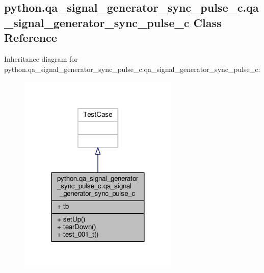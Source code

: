 \subsection{python.\+qa\+\_\+signal\+\_\+generator\+\_\+sync\+\_\+pulse\+\_\+c.\+qa\+\_\+signal\+\_\+generator\+\_\+sync\+\_\+pulse\+\_\+c Class Reference}
\label{classpython_1_1qa__signal__generator__sync__pulse__c_1_1qa__signal__generator__sync__pulse__c}


Inheritance diagram for python.\+qa\+\_\+signal\+\_\+generator\+\_\+sync\+\_\+pulse\+\_\+c.\+qa\+\_\+signal\+\_\+generator\+\_\+sync\+\_\+pulse\+\_\+c\+:
\nopagebreak
\begin{figure}[H]
\begin{center}
\leavevmode
\includegraphics[width=216pt]{da/d3a/classpython_1_1qa__signal__generator__sync__pulse__c_1_1qa__signal__generator__sync__pulse__c__inherit__graph}
\end{center}
\end{figure}



